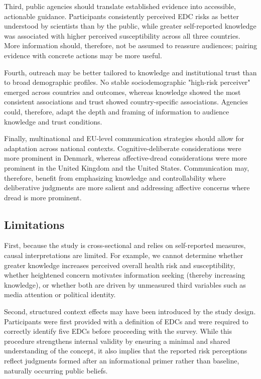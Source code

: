 Third, public agencies should translate established evidence into accessible, actionable guidance. Participants consistently perceived EDC risks as better understood by scientists than by the public, while greater self-reported knowledge was associated with higher perceived susceptibility across all three countries. More information should, therefore, not be assumed to reassure audiences; pairing evidence with concrete actions may be more useful.

Fourth, outreach may be better tailored to knowledge and institutional trust than to broad demographic profiles. No stable sociodemographic "high-risk perceiver" emerged across countries and outcomes, whereas knowledge showed the most consistent associations and trust showed country-specific associations. Agencies could, therefore, adapt the depth and framing of information to audience knowledge and trust conditions.

Finally, multinational and EU-level communication strategies should allow for adaptation across national contexts. Cognitive-deliberate considerations were more prominent in Denmark, whereas affective-dread considerations were more prominent in the United Kingdom and the United States. Communication may, therefore, benefit from emphasizing knowledge and controllability where deliberative judgments are more salient and addressing affective concerns where dread is more prominent.

\subsection{Limitations}
First, because the study is cross-sectional and relies on self-reported measures, causal interpretations are limited. For example, we cannot determine whether greater knowledge increases perceived overall health risk and susceptibility, whether heightened concern motivates information seeking (thereby increasing knowledge), or whether both are driven by unmeasured third variables such as media attention or political identity.

Second, structured context effects may have been introduced by the study design. Participants were first provided with a definition of EDCs and were required to correctly identify five EDCs before proceeding with the survey. While this procedure strengthens internal validity by ensuring a minimal and shared understanding of the concept, it also implies that the reported risk perceptions reflect judgments formed after an informational primer rather than baseline, naturally occurring public beliefs.

